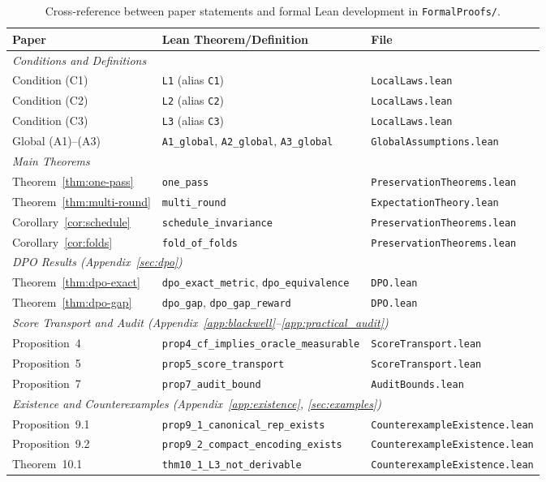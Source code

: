 \begin{table}[h]
\centering
\small
\begin{tabular}{lll}
\toprule
Paper & Lean Theorem/Definition & File \\
\midrule
\multicolumn{3}{l}{\emph{Conditions and Definitions}} \\
Condition (C1) & \texttt{L1} (alias \texttt{C1}) & \texttt{LocalLaws.lean} \\
Condition (C2) & \texttt{L2} (alias \texttt{C2}) & \texttt{LocalLaws.lean} \\
Condition (C3) & \texttt{L3} (alias \texttt{C3}) & \texttt{LocalLaws.lean} \\
Global (A1)--(A3) & \texttt{A1\_global}, \texttt{A2\_global}, \texttt{A3\_global} & \texttt{GlobalAssumptions.lean} \\
\midrule
\multicolumn{3}{l}{\emph{Main Theorems}} \\
Theorem~\ref{thm:one-pass} & \texttt{one\_pass} & \texttt{PreservationTheorems.lean} \\
Theorem~\ref{thm:multi-round} & \texttt{multi\_round} & \texttt{ExpectationTheory.lean} \\
Corollary~\ref{cor:schedule} & \texttt{schedule\_invariance} & \texttt{PreservationTheorems.lean} \\
Corollary~\ref{cor:folds} & \texttt{fold\_of\_folds} & \texttt{PreservationTheorems.lean} \\
\midrule
\multicolumn{3}{l}{\emph{DPO Results (Appendix~\ref{sec:dpo})}} \\
Theorem~\ref{thm:dpo-exact} & \texttt{dpo\_exact\_metric}, \texttt{dpo\_equivalence} & \texttt{DPO.lean} \\
Theorem~\ref{thm:dpo-gap} & \texttt{dpo\_gap}, \texttt{dpo\_gap\_reward} & \texttt{DPO.lean} \\
\midrule
\multicolumn{3}{l}{\emph{Score Transport and Audit (Appendix~\ref{app:blackwell}--\ref{app:practical_audit})}} \\
Proposition~4 & \texttt{prop4\_cf\_implies\_oracle\_measurable} & \texttt{ScoreTransport.lean} \\
Proposition~5 & \texttt{prop5\_score\_transport} & \texttt{ScoreTransport.lean} \\
Proposition~7 & \texttt{prop7\_audit\_bound} & \texttt{AuditBounds.lean} \\
\midrule
\multicolumn{3}{l}{\emph{Existence and Counterexamples (Appendix~\ref{app:existence}, \ref{sec:examples})}} \\
Proposition~9.1 & \texttt{prop9\_1\_canonical\_rep\_exists} & \texttt{CounterexampleExistence.lean} \\
Proposition~9.2 & \texttt{prop9\_2\_compact\_encoding\_exists} & \texttt{CounterexampleExistence.lean} \\
Theorem~10.1 & \texttt{thm10\_1\_L3\_not\_derivable} & \texttt{CounterexampleExistence.lean} \\
\bottomrule
\end{tabular}
\caption{Cross-reference between paper statements and formal Lean development in \texttt{FormalProofs/}.}
\label{tab:lean-xref}
\end{table}

